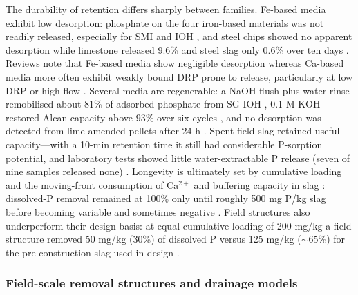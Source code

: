 \documentclass[11pt]{article}
\begin{document}
The durability of retention differs sharply between families. Fe-based media exhibit low desorption: phosphate on the four iron-based materials was not readily released, especially for SMI and IOH \parencite{Allred2014}, and steel chips showed no apparent desorption while limestone released 9.6\% and steel slag only 0.6\% over ten days \parencite{Sellner2019b}. Reviews note that Fe-based media show negligible desorption whereas Ca-based media more often exhibit weakly bound DRP prone to release, particularly at low DRP or high flow \parencite{Mendes2022}. Several media are regenerable: a NaOH flush plus water rinse remobilised about 81\% of adsorbed phosphate from SG-IOH \parencite{Allred2017}, 0.1 M KOH restored Alcan capacity above 93\% over six cycles \parencite{Kumari2025}, and no desorption was detected from lime-amended pellets after 24 h \parencite{Li2017}. Spent field slag retained useful capacity---with a 10-min retention time it still had considerable P-sorption potential, and laboratory tests showed little water-extractable P release (seven of nine samples released none) \parencite{Shedekar2020}. Longevity is ultimately set by cumulative loading and the moving-front consumption of $\mathrm{Ca^{2+}}$ and buffering capacity in slag \parencite{Wang2020d}: dissolved-P removal remained at 100\% only until roughly 500 mg P/kg slag before becoming variable and sometimes negative \parencite{Penn2020}. Field structures also underperform their design basis: at equal cumulative loading of 200 mg/kg a field structure removed 50 mg/kg (30\%) of dissolved P versus 125 mg/kg ($\sim$65\%) for the pre-construction slag used in design \parencite{Shedekar2020}.

\subsubsection{Field-scale removal structures and drainage models}
\end{document}
